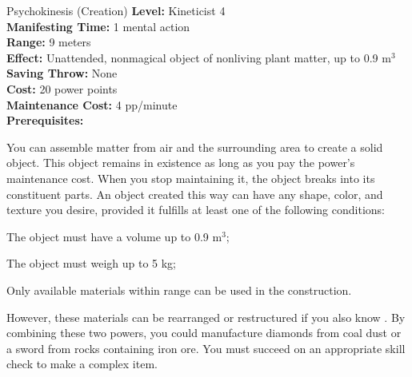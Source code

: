 {Psychokinesis (Creation)}
{
	\textbf{Level:}
	Kineticist 4\\
	\textbf{Manifesting Time:}
	1 mental action\\
	\textbf{Range:}
	9 meters\\
	\textbf{Effect:}
	Unattended, nonmagical object of nonliving plant matter, up to 0.9 m$^3$\\
	\textbf{Saving Throw:}
	None\\
	\textbf{Cost:}
	20 power points\\
	\textbf{Maintenance Cost:}
	4 pp/minute\\
	\textbf{Prerequisites:}
	\\
}
{
	You can assemble matter from air and the surrounding area to create a solid object. This object remains in existence as long as you pay the power's maintenance cost. When you stop maintaining it, the object breaks into its constituent parts. An object created this way can have any shape, color, and texture you desire, provided it fulfills at least one of the following conditions:
	\begin{enumerate*}
	\item The object must have a volume up to 0.9 m$^3$;
	\item The object must weigh up to 5 kg;
	\item Only available materials within range can be used in the construction.
	\end{enumerate*}

	However, these materials can be rearranged or restructured if you also know . By combining these two powers, you could manufacture diamonds from coal dust or a sword from rocks containing iron ore. You must succeed on an appropriate skill check to make a complex item.
}
